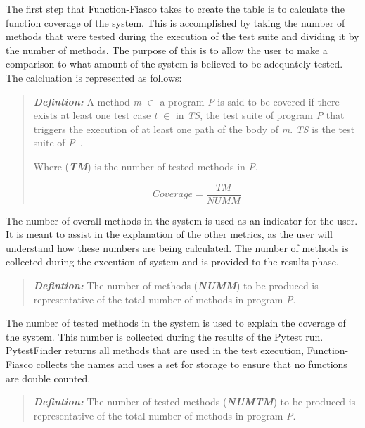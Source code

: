         The first step that Function-Fiasco takes to create the table is to calculate the function coverage of the system. This is accomplished by taking the number of methods that were tested during the execution of the test suite and dividing it by the number of methods. The purpose of this is to allow the user to make a comparison to what amount of the system is believed to be adequately tested. The calcluation is represented as follows:

        \begin{quote}
        \textbf{\textit{Defintion:}} A method \textit{m} $\in$ a program \textit{P} is said to be covered if there exists at least
        one test case \textit{t} $\in$ in \textit{TS}, the test suite of program \textit{P} that triggers the execution of at least one path of the
        body of \textit{m}. \textit{TS} is the test suite of \textit{P}~\cite{vera2017comprehensive}.

        Where (\textbf{\textit{TM}}) is the number of tested methods in \textit{P},

        \begin{equation}
        Coverage = \frac{TM}{NUMM}
        \end{equation}
        \end{quote}

        The number of overall methods in the system is used as an indicator for the user. It is meant to assist in the explanation of the other metrics, as the user will understand how these numbers are being calculated. The number of methods is collected during the execution of system and is provided to the results phase.

        \begin{quote}
        \textbf{\textit{Defintion:}} The number of methods (\textbf{\textit{NUMM}}) to be produced is representative of the total number of methods in program \textit{P}.
        \end{quote}

        The number of tested methods in the system is used to explain the coverage of the system. This number is collected during the results of the Pytest run. PytestFinder returns all methods that are used in the test execution, Function-Fiasco collects the names and uses a set for storage to ensure that no functions are double counted.

        \begin{quote}
        \textbf{\textit{Defintion:}} The number of tested methods (\textbf{\textit{NUMTM}}) to be produced is representative of the total number of methods in program \textit{P}.
        \end{quote}

